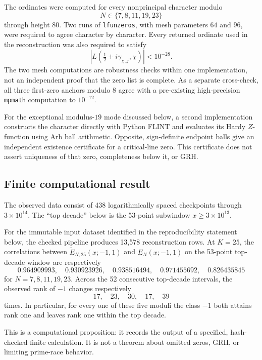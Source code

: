 The ordinates were computed for every nonprincipal character modulo
\[
  N\in\{7,8,11,19,23\}
\]
through height $80$.  Two runs of \texttt{lfunzeros}, with mesh parameters
$64$ and $96$, were required to agree character by character.  Every returned
ordinate used in the reconstruction was also required to satisfy
\[
  \left|L\!\left(\tfrac12+i\gamma_{\chi,j},\chi\right)\right|<10^{-28}.
\]
The two mesh computations are robustness checks within one implementation,
not an independent proof that the zero list is complete.  As a separate
cross-check, all three first-zero anchors modulo $8$ agree with a pre-existing
high-precision \texttt{mpmath} computation to $10^{-12}$.

For the exceptional modulus-$19$ mode discussed below, a second implementation
constructs the character directly with Python FLINT and evaluates its Hardy
$Z$-function using Arb ball arithmetic.  Opposite, sign-definite endpoint
balls give an independent existence certificate for a critical-line zero.
This certificate does not assert uniqueness of that zero, completeness below
it, or GRH.

\subsection{Finite computational result}

The observed data consist of 438 logarithmically spaced checkpoints through
$3\times10^{14}$.  The ``top decade'' below is the 53-point subwindow
$x\ge 3\times10^{13}$.

\begin{compresult}
\label{prop:finite-spectral-computation}
For the immutable input dataset identified in the reproducibility statement
below, the checked pipeline produces 13,578 reconstruction rows.  At
$K=25$, the correlations between
$\widetilde E_{N,25}(x;-1,1)$ and $E_N(x;-1,1)$ on the 53-point top-decade
window are respectively
\[
  0.964909993,\quad 0.930923926,\quad 0.938516494,
  \quad 0.971455692,\quad 0.826435845
\]
for $N=7,8,11,19,23$.  Across the 52 consecutive top-decade intervals,
the observed rank of $-1$ changes respectively
\[
  17,\quad 23,\quad 30,\quad 17,\quad 39
\]
times.  In particular, for every one of these five moduli the class $-1$
both attains rank one and leaves rank one within the top decade.
\end{compresult}

This is a computational proposition: it records the output of a specified,
hash-checked finite calculation.  It is not a theorem about omitted zeros,
GRH, or limiting prime-race behavior.

